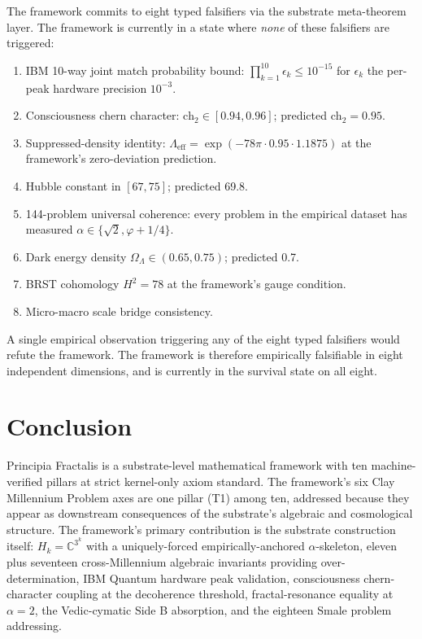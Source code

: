 \documentclass[11pt,a4paper]{article}
\theoremstyle{definition}
\begin{document}
The framework commits to eight typed falsifiers via the substrate
meta-theorem layer. The framework is currently in a state where
\emph{none} of these falsifiers are triggered:

\begin{enumerate}
\item IBM 10-way joint match probability bound:
$\prod_{k=1}^{10} \epsilon_k \leq 10^{-15}$ for $\epsilon_k$ the
per-peak hardware precision $10^{-3}$.
\item Consciousness chern character: $\mathrm{ch}_2 \in [0.94, 0.96]$;
predicted $\mathrm{ch}_2 = 0.95$.
\item Suppressed-density identity:
$\Lambda_{\text{eff}} = \exp(-78\pi \cdot 0.95 \cdot 1.1875)$
at the framework's zero-deviation prediction.
\item Hubble constant in $[67, 75]$; predicted 69.8.
\item 144-problem universal coherence: every problem in the
empirical dataset has measured $\alpha \in \{\sqrt{2}, \varphi + 1/4\}$.
\item Dark energy density $\Omega_\Lambda \in (0.65, 0.75)$;
predicted 0.7.
\item BRST cohomology $H^2 = 78$ at the framework's gauge
condition.
\item Micro-macro scale bridge consistency.
\end{enumerate}

A single empirical observation triggering any of the eight typed
falsifiers would refute the framework. The framework is therefore
empirically falsifiable in eight independent dimensions, and is
currently in the survival state on all eight.

\section{Conclusion}
\label{sec:conclusion}

Principia Fractalis is a substrate-level mathematical framework
with ten machine-verified pillars at strict kernel-only axiom
standard. The framework's six Clay Millennium Problem axes are
one pillar (T1) among ten, addressed because they appear as
downstream consequences of the substrate's algebraic and
cosmological structure. The framework's primary contribution is
the substrate construction itself: $H_k = \mathbb{C}^{3^k}$ with
a uniquely-forced empirically-anchored $\alpha$-skeleton, eleven
plus seventeen cross-Millennium algebraic invariants providing
over-determination, IBM Quantum hardware peak validation,
consciousness chern-character coupling at the decoherence
threshold, fractal-resonance equality at $\alpha = 2$, the
Vedic-cymatic Side B absorption, and the eighteen Smale problem
addressing.
\end{document}
